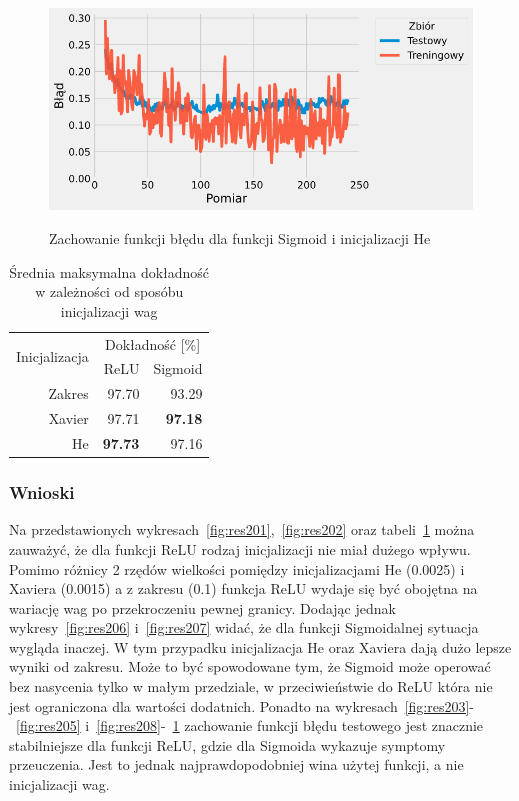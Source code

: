 \documentclass{article}
\begin{document}
\begin{figure}[H]
	\centering
	\caption{Zachowanie funkcji błędu dla funkcji Sigmoid i inicjalizacji He}
	\includegraphics[width=\textwidth]{sig_init_he.png}
	\label{fig:res210}
\end{figure}

\begin{table}[H]
	\caption{Średnia maksymalna dokładność w zależności od sposóbu inicjalizacji wag}
	\label{tabela-res-21}
	\centering
	\begin{tabular}{rrr}
		\toprule
		\multirow{2}{*}{Inicjalizacja} & \multicolumn{2}{c}{Dokładność [\%]} \\
		       & ReLU           & Sigmoid        \\
		\midrule
		Zakres & 97.70          & 93.29          \\
		Xavier & 97.71          & \textbf{97.18} \\
		He     & \textbf{97.73} & 97.16          \\
		\bottomrule
	\end{tabular}
\end{table}

\subsubsection*{Wnioski}

Na przedstawionych wykresach~\ref{fig:res201},~\ref{fig:res202} oraz tabeli~\ref{tabela-res-21} można zauważyć, że dla funkcji ReLU rodzaj inicjalizacji nie miał dużego wpływu. Pomimo różnicy 2 rzędów wielkości pomiędzy inicjalizacjami He (0.0025) i Xaviera (0.0015) a z zakresu (0.1) funkcja ReLU wydaje się być obojętna na wariację wag po przekroczeniu pewnej granicy. Dodając jednak wykresy~\ref{fig:res206} i~\ref{fig:res207} widać, że dla funkcji Sigmoidalnej sytuacja wygląda inaczej. W tym przypadku inicjalizacja He oraz Xaviera dają dużo lepsze wyniki od zakresu. Może to być spowodowane tym, że Sigmoid może operować bez nasycenia tylko w małym przedziale, w przeciwieństwie do ReLU która nie jest ograniczona dla wartości dodatnich. Ponadto na wykresach~\ref{fig:res203}-~\ref{fig:res205} i~\ref{fig:res208}-~\ref{fig:res210} zachowanie funkcji błędu testowego jest znacznie stabilniejsze dla funkcji ReLU, gdzie dla Sigmoida wykazuje symptomy przeuczenia. Jest to jednak najprawdopodobniej wina użytej funkcji, a nie inicjalizacji wag.
\end{document}
